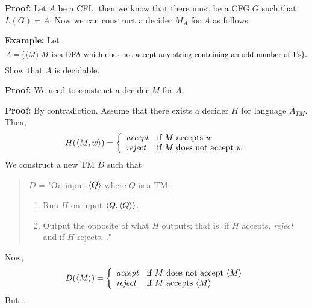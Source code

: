 \documentclass[a4paper,blends,pdf,colorBG,slideColor]{prosper}
\begin{document}
{\small
{}

{\bf Proof:} Let $A$ be a CFL, then we know that there must be a CFG $G$ such that
$L(G) = A$.  Now we can construct a decider $M_A$ for $A$ as follows:

}
\es


{\bf Example:} Let \[A = \{ \langle {M} \rangle | \mbox{$M$ is a DFA which does not accept any
string containing an odd number of $1$'s}\}.\]
Show that $A$ is decidable.

{\bf Proof:} We need to construct a decider $M$ for $A$.

\es


{\small
{}
{\bf Proof:} By contradiction.  Assume that there exists a decider $H$ for language $A_{TM}$. Then,
\[
H(\langle {M,w} \rangle) = \left \{
\begin{array}{ll}
\mbox{{\em accept}} & \mbox{if $M$ accepts $w$}\\
\mbox{{\em reject}} & \mbox{if $M$ does not accept $w$}
\end{array}
\right .
\]
We construct a new TM $D$ such that
\begin{quote}
$D$ = "On input $\langle {Q} \rangle$ where $Q$ is a TM:
\begin{enumerate}
\item Run $H$ on input $\langle {Q, \ensuremath{\langle {Q} \rangle}} \rangle$.
\item Output the opposite of what $H$ outputs; that is, if $H$ accepts, {\em reject}
and if 
$H$ rejects, \accept."
\end{enumerate}
\end{quote}
Now,
\[
D(\langle {M} \rangle) = \left \{
\begin{array}{ll}
\mbox{{\em accept}} & \mbox{if $M$ does not accept $\langle {M} \rangle$}\\
\mbox{{\em reject}} & \mbox{if $M$ accepts $\langle {M} \rangle$}
\end{array}
\right .
\]
But...
}
\es
\end{document}
